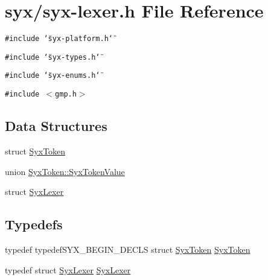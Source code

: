 \hypertarget{syx-lexer_8h}{
\section{syx/syx-lexer.h File Reference}
\label{syx-lexer_8h}
}
{\tt \#include \char`\"{}syx-platform.h\char`\"{}}\par
{\tt \#include \char`\"{}syx-types.h\char`\"{}}\par
{\tt \#include \char`\"{}syx-enums.h\char`\"{}}\par
{\tt \#include $<$gmp.h$>$}\par
\subsection*{Data Structures}
\begin{CompactItemize}
\item 
struct \hyperlink{struct_syx_token}{SyxToken}
\item 
union \hyperlink{union_syx_token_1_1_syx_token_value}{SyxToken::SyxTokenValue}
\item 
struct \hyperlink{struct_syx_lexer}{SyxLexer}
\end{CompactItemize}
\subsection*{Typedefs}
\begin{CompactItemize}
\item 
typedef typedefSYX\_\-BEGIN\_\-DECLS struct \hyperlink{struct_syx_token}{SyxToken} \hyperlink{syx-lexer_8h_7502114c271d052a9577c868bbb724a1}{SyxToken}
\item 
typedef struct \hyperlink{struct_syx_lexer}{SyxLexer} \hyperlink{syx-lexer_8h_3733ec16e98fecf11d71d3cbe946b2bf}{SyxLexer}
\end{CompactItemize}
